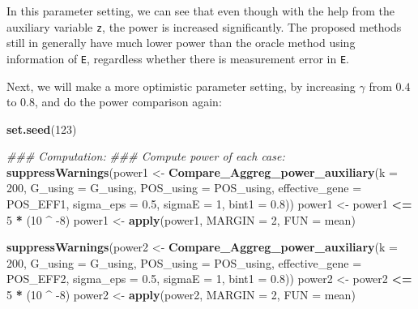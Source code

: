 \documentclass[
]{article}
\newenvironment{Shaded}{\begin{snugshade}}{\end{snugshade}}
\newcommand{\CommentTok}[1]{\textcolor[rgb]{0.56,0.35,0.01}{\textit{#1}}}
\newcommand{\DataTypeTok}[1]{\textcolor[rgb]{0.13,0.29,0.53}{#1}}
\newcommand{\DecValTok}[1]{\textcolor[rgb]{0.00,0.00,0.81}{#1}}
\newcommand{\FloatTok}[1]{\textcolor[rgb]{0.00,0.00,0.81}{#1}}
\newcommand{\KeywordTok}[1]{\textcolor[rgb]{0.13,0.29,0.53}{\textbf{#1}}}
\newcommand{\NormalTok}[1]{#1}
\newcommand{\OperatorTok}[1]{\textcolor[rgb]{0.81,0.36,0.00}{\textbf{#1}}}
\newcommand{\StringTok}[1]{\textcolor[rgb]{0.31,0.60,0.02}{#1}}
\begin{document}
In this parameter setting, we can see that even though with the help
from the auxiliary variable \texttt{z}, the power is increased
significantly. The proposed methods still in generally have much lower
power than the oracle method using information of \texttt{E}, regardless
whether there is measurement error in \texttt{E}.

Next, we will make a more optimistic parameter setting, by increasing
\(\gamma\) from \(0.4\) to \(0.8\), and do the power comparison again:

\begin{Shaded}
\begin{Highlighting}[]
\KeywordTok{set.seed}\NormalTok{(}\DecValTok{123}\NormalTok{)}

\CommentTok{### Computation:}
\CommentTok{### Compute power of each case:}
\KeywordTok{suppressWarnings}\NormalTok{(power1 <-}\StringTok{ }\KeywordTok{Compare_Aggreg_power_auxiliary}\NormalTok{(}\DataTypeTok{k =} \DecValTok{200}\NormalTok{, }\DataTypeTok{G_using =}\NormalTok{ G_using, }\DataTypeTok{POS_using =}\NormalTok{ POS_using, }\DataTypeTok{effective_gene =}\NormalTok{ POS_EFF1, }\DataTypeTok{sigma_eps =} \FloatTok{0.5}\NormalTok{, }\DataTypeTok{sigmaE =} \DecValTok{1}\NormalTok{, }\DataTypeTok{bint1 =} \FloatTok{0.8}\NormalTok{))}
\NormalTok{power1 <-}\StringTok{ }\NormalTok{power1 }\OperatorTok{<=}\StringTok{ }\DecValTok{5} \OperatorTok{*}\StringTok{ }\NormalTok{(}\DecValTok{10} \OperatorTok{^}\StringTok{ }\DecValTok{-8}\NormalTok{)}
\NormalTok{power1 <-}\StringTok{ }\KeywordTok{apply}\NormalTok{(power1, }\DataTypeTok{MARGIN =} \DecValTok{2}\NormalTok{, }\DataTypeTok{FUN =}\NormalTok{ mean)}

\KeywordTok{suppressWarnings}\NormalTok{(power2 <-}\StringTok{ }\KeywordTok{Compare_Aggreg_power_auxiliary}\NormalTok{(}\DataTypeTok{k =} \DecValTok{200}\NormalTok{, }\DataTypeTok{G_using =}\NormalTok{ G_using, }\DataTypeTok{POS_using =}\NormalTok{ POS_using, }\DataTypeTok{effective_gene =}\NormalTok{ POS_EFF2, }\DataTypeTok{sigma_eps =} \FloatTok{0.5}\NormalTok{, }\DataTypeTok{sigmaE =} \DecValTok{1}\NormalTok{, }\DataTypeTok{bint1 =} \FloatTok{0.8}\NormalTok{))}
\NormalTok{power2 <-}\StringTok{ }\NormalTok{power2 }\OperatorTok{<=}\StringTok{ }\DecValTok{5} \OperatorTok{*}\StringTok{ }\NormalTok{(}\DecValTok{10} \OperatorTok{^}\StringTok{ }\DecValTok{-8}\NormalTok{)}
\NormalTok{power2 <-}\StringTok{ }\KeywordTok{apply}\NormalTok{(power2, }\DataTypeTok{MARGIN =} \DecValTok{2}\NormalTok{, }\DataTypeTok{FUN =}\NormalTok{ mean)}


\end{Highlighting}
\end{Shaded}
\end{document}
